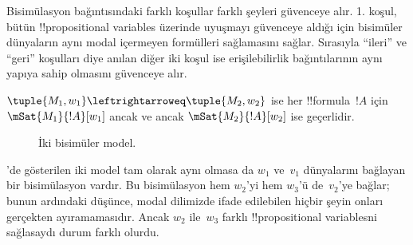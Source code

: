 Bisimülasyon bağıntısındaki farklı koşullar farklı şeyleri güvenceye alır. 1.
koşul, bütün !!{propositional variable}s üzerinde uyuşmayı güvenceye aldığı
için bisimüler dünyaların aynı modal içermeyen formülleri sağlamasını sağlar.
Sırasıyla ``ileri'' ve ``geri'' koşulları diye anılan diğer iki koşul ise
erişilebilirlik bağıntılarının aynı yapıya sahip olmasını güvenceye alır.

\begin{thm}
$\tuple{M_1, w_1} \leftrightarroweq \tuple{M_2, w_2}$ ise her
!!{formula}~$!A$ için $\mSat{M_1}{!A}[w_1]$ ancak ve ancak
$\mSat{M_2}{!A}[w_2]$ ise geçerlidir.
\end{thm}

\begin{figure}
  \begin{center}
  \end{center}
  \caption{İki bisimüler model.}
\end{figure}

'de gösterilen iki model tam olarak aynı olmasa da
$w_1$ ve~$v_1$ dünyalarını bağlayan bir bisimülasyon vardır. Bu bisimülasyon
hem $w_2$'yi hem $w_3$'ü de~$v_2$'ye bağlar; bunun ardındaki düşünce, modal
dilimizde ifade edilebilen hiçbir şeyin onları gerçekten ayıramamasıdır.
Ancak $w_2$ ile~$w_3$ farklı !!{propositional variable}s{}ni sağlasaydı durum
farklı olurdu.

